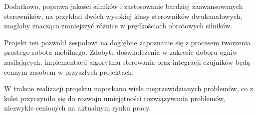 \documentclass{report}
\begin{document}
Dodatkowo, poprawa jakości silników i zastosowanie bardziej zaawansowanych sterowników, na przykład dwóch wysokiej klasy sterowników dwukanałowych, mogłaby znacząco zmniejszyć różnice w prędkościach obrotowych silników.

Projekt ten pozwolił zespołowi na dogłębne zapoznanie się z procesem tworzenia prostego robota mobilnego. Zdobyte doświadczenia w zakresie doboru ogniw zasilających, implementacji algorytmu sterowania oraz integracji czujników będą cennym zasobem w przyszłych projektach.

W trakcie realizacji projektu napotkano wiele nieprzewidzianych problemów, co z kolei przyczyniło się do rozwoju umiejętności rozwiązywania problemów, niezwykle cenionych na 
aktualnym rynku pracy. 

\newpage

\nocite{*}
\printbibliography
\end{document}
